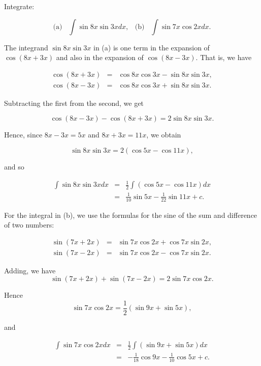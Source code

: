 \begin{example}
Integrate: 

$$
\mbox{(a)}\;\;\; \int \sin 8x \sin 3x dx, \;\;\;\mbox{(b)}\;\;\; \int \sin 7x \cos 2x dx.
$$

The integrand $\sin 8x \sin 3x$ in (a) is one term in the expansion of $\cos(8x + 3x)$ and also in the
expansion of $\cos(8x - 3x)$. That is, we have 

 \begin{eqnarray*}
\cos(8x + 3x) &=& \cos 8x \cos 3x - \sin 8x \sin 3x,\\
\cos(8x - 3x) &=& \cos 8x \cos 3x + \sin 8x \sin 3x. 
\end{eqnarray*}

\noindent Subtracting the first from the second, we get

$$
\cos(8x - 3x) - \cos(8x + 3x) = 2 \sin 8x \sin 3x. 
$$

\noindent Hence, since $8x - 3x = 5x$ and $8x + 3x = 11x$,
we obtain 

$$
\sin 8x \sin 3x = 2 (\cos 5x - \cos 11x), 
$$

\noindent and so

\begin{eqnarray*}
\int \sin 8x \sin 3x dx &=& \frac{1}{2} \int (\cos 5x - \cos 11x) dx\\
&=& \frac{1}{10} \sin 5x - \frac{1}{22} \sin 11x + c.
\end{eqnarray*}

For the integral in (b), we use the formulas for the sine of the sum and
difference of two numbers: 

\begin{eqnarray*}
\sin(7x + 2x) &=& \sin 7x \cos 2x + \cos 7x \sin 2x, \\
\sin(7x - 2x) &=& \sin 7x \cos 2x - \cos 7x \sin 2x. 
\end{eqnarray*}

\noindent Adding, we have 
$$
\sin(7x + 2x) + \sin(7x - 2x) = 2 \sin 7x \cos 2x.
$$

\noindent Hence
$$
\sin 7x \cos 2x = \frac{1}{2} (\sin 9x + \sin 5x), 
$$

\noindent and

\begin{eqnarray*}
\int \sin 7x \cos 2x dx &=& \frac{1}{2}\int (\sin 9x + \sin 5x) dx\\
&=& - \frac{1}{18} \cos 9x - \frac{1}{10} \cos 5x + c.
\end{eqnarray*}
\end{example}

